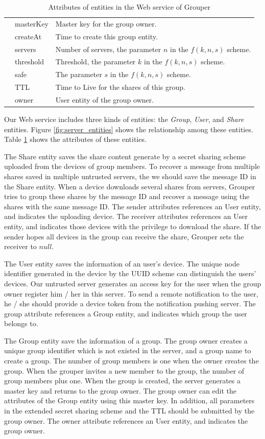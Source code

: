 \documentclass[a4paper,11pt]{report}
\begin{document}
\begin{table}[t]
\begin{tabular}{@{}lll@{}}
		& masterKey & Master key for the group owner. \\
		& createAt & Time to create this group entity. \\
		& servers & Number of servers, the parameter $n$ in the $f(k, n, s)$ scheme. \\
		& threshold & Threshold, the parameter $k$ in the $f(k, n, s)$ scheme. \\
		& safe & The parameter $s$ in the $f(k, n, s)$ scheme.  \\
		& TTL & Time to Live for the shares of this group.  \\
		& owner & User entity of the group owner. \\ 
		\bottomrule
	\end{tabular}
	\caption{Attributes of entities in the Web service of Grouper}
	\label{table:entity_attributes}
\end{table}

Our Web service includes three kinds of entities: the \emph{Group}, \emph{User}, and \emph{Share} entities.
Figure \ref{fig:server_entities} shows the relationship among these entities.
Table \ref{table:entity_attributes} shows the attributes of these entities.

The Share entity saves the share content generate by a secret sharing scheme uploaded from the devices of group members.
To recover a message from multiple shares saved in multiple untrusted servers, the we should save the message ID in the Share entity.
When a device downloads several shares from servers, Grouper tries to group these shares by the message ID and recover a message using the shares with the same message ID.
The sender attributes references an User entity, and indicates the uploading device.
The receiver attributes references an User entity, and indicates those devices with the privilege to download the share.
If the sender hopes all devices in the group can receive the share, Grouper sets the receiver to $null$.

The User entity saves the information of an user's device.
The unique node identifier generated in the device by the UUID scheme can distinguish the users' devices.
Our untrusted server generates an access key for the user when the group owner register him / her in this server.
To send a remote notification to the user, he / she should provide a device token from the notification pushing server.
The group attribute references a Group entity, and indicates which group the user belongs to.

The Group entity save the information of a group.
The group owner creates a unique group identifier which is not existed in the server, and a group name to create a group.
The number of group members is one when the owner creates the group.
When the grouper invites a new member to the group, the number of group members plus one.
When the group is created, the server generates a master key and returns to the group owner.
The group owner can edit the attributes of the Group entity using this master key.
In addition, all parameters in the extended secret sharing scheme and the TTL should be submitted by the group owner.
The owner attribute references an User entity, and indicates the group owner.
\end{document}
